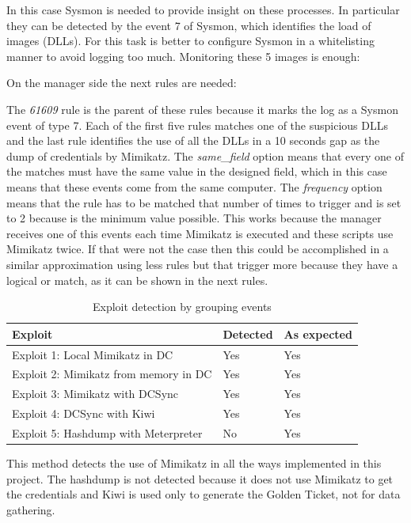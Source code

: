 \linej
In this case Sysmon is needed to provide insight on these processes. In particular they can be detected by the event 7 of Sysmon, which identifies the load of images (DLLs)\cite{sysmon}\cite{sysmon_event_7_mimikatz}.
\linej
\linej
For this task is better to configure Sysmon in a whitelisting manner to avoid logging too much. Monitoring these 5 images is enough:
\linej

\linej
On the manager side the next rules are needed:
\linej

\linej
The \textit{61609} rule is the parent of these rules because it marks the log as a Sysmon event of type 7. Each of the first five rules matches one of the suspicious DLLs and the last rule identifies the use of all the DLLs in a 10 seconds gap as the dump of credentials by Mimikatz.
The \textit{same\_field} option means that every one of the matches must have the same value in the designed field, which in this case means that these events come from the same computer.
\linej
The \textit{frequency} option means that the rule has to be matched that number of times to trigger and is set to 2 because is the minimum value possible. This works because the manager receives one of this events each time Mimikatz is executed and these scripts use Mimikatz twice.
If that were not the case then this could be accomplished in a similar approximation using less rules but that trigger more because they have a logical or match, as it can be shown in the next rules.
\linej


\begin{table}[H]
	\centering
	\begin{tabular}{|l|l|l|}
		\hline
		\rowcolor{gray!30}
		Exploit & Detected & As expected \\ \hline
		Exploit 1: Local Mimikatz in DC& \cellcolor{green!60}Yes& \cellcolor{green!60}Yes\\ \hline
		Exploit 2: Mimikatz from memory in DC& \cellcolor{green!60}Yes& \cellcolor{green!60}Yes\\ \hline
		Exploit 3: Mimikatz with DCSync& \cellcolor{green!60}Yes& \cellcolor{green!60}Yes\\ \hline
		Exploit 4: DCSync with Kiwi& \cellcolor{green!60}Yes& \cellcolor{green!60}Yes\\ \hline
		Exploit 5: Hashdump with Meterpreter& \cellcolor{red!60}No& \cellcolor{green!60}Yes\\ \hline
	\end{tabular}
	\caption{Exploit detection by grouping events}
\end{table}
This method detects the use of Mimikatz in all the ways implemented in this project. The hashdump is not detected because it does not use Mimikatz to get the credentials and Kiwi is used only to generate the Golden Ticket, not for data gathering.

